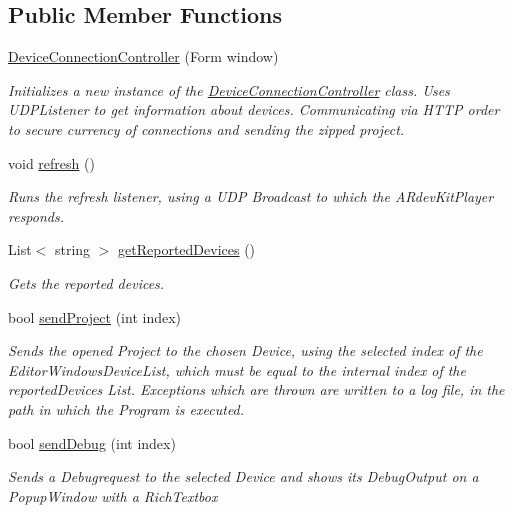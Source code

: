 \subsection*{Public Member Functions}
\begin{DoxyCompactItemize}
\item 
\hyperlink{class_a_rdev_kit_1_1_controller_1_1_connections_1_1_device_connection_1_1_device_connection_controller_a6d505b2d3b51a10e9d83058157a1c62c}{Device\-Connection\-Controller} (Form window)
\begin{DoxyCompactList}\small\item\em Initializes a new instance of the \hyperlink{class_a_rdev_kit_1_1_controller_1_1_connections_1_1_device_connection_1_1_device_connection_controller}{Device\-Connection\-Controller} class. Uses U\-D\-P\-Listener to get information about devices. Communicating via H\-T\-T\-P order to secure currency of connections and sending the zipped project. \end{DoxyCompactList}\item 
void \hyperlink{class_a_rdev_kit_1_1_controller_1_1_connections_1_1_device_connection_1_1_device_connection_controller_a2fa2baab02402dec9c2dce90fadeb54c}{refresh} ()
\begin{DoxyCompactList}\small\item\em Runs the refresh listener, using a U\-D\-P Broadcast to which the A\-Rdev\-Kit\-Player responds. \end{DoxyCompactList}\item 
List$<$ string $>$ \hyperlink{class_a_rdev_kit_1_1_controller_1_1_connections_1_1_device_connection_1_1_device_connection_controller_a22af53d2338217cf5c77e4f7326cee79}{get\-Reported\-Devices} ()
\begin{DoxyCompactList}\small\item\em Gets the reported devices. \end{DoxyCompactList}\item 
bool \hyperlink{class_a_rdev_kit_1_1_controller_1_1_connections_1_1_device_connection_1_1_device_connection_controller_a4fcdf74b36bf40335dfe5179f78f2524}{send\-Project} (int index)
\begin{DoxyCompactList}\small\item\em Sends the opened Project to the chosen Device, using the selected index of the Editor\-Windows\-Device\-List, which must be equal to the internal index of the reported\-Devices List. Exceptions which are thrown are written to a log file, in the path in which the Program is executed. \end{DoxyCompactList}\item 
bool \hyperlink{class_a_rdev_kit_1_1_controller_1_1_connections_1_1_device_connection_1_1_device_connection_controller_a2810b006ae43957884b041496f4f3498}{send\-Debug} (int index)
\begin{DoxyCompactList}\small\item\em Sends a Debugrequest to the selected Device and shows its Debug\-Output on a Popup\-Window with a Rich\-Textbox \end{DoxyCompactList}\end{DoxyCompactItemize}
